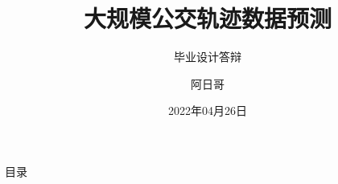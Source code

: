 \documentclass[aspectratio=169]{beamer}
\author{阿日哥}
\title{大规模公交轨迹数据预测}
\subtitle{毕业设计答辩}
\institute{武汉大学计算机学院}
\date{2022年04月26日}
\begin{document}
\kaishu
\begin{frame}
    \titlepage
\end{frame}

\begin{frame}{目录}
                
        \transfade %
        \tableofcontents
\end{frame}









\end{document}
